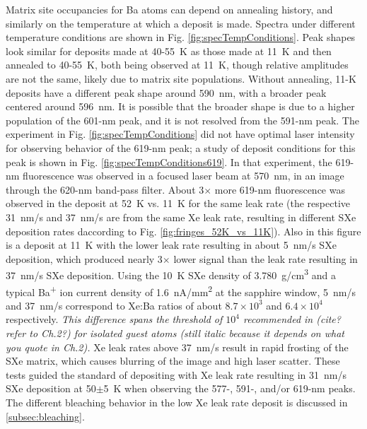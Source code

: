 Matrix site occupancies for Ba atoms can depend on annealing history, and similarly on the temperature at which a deposit is made.  Spectra under different temperature conditions are shown in Fig. \ref{fig:specTempConditions}.  Peak shapes look similar for deposits made at 40-55~K as those made at 11~K and then annealed to 40-55~K, both being observed at 11~K, though relative amplitudes are not the same, likely due to matrix site populations.  Without annealing, 11-K deposits have a different peak shape around 590~nm, with a broader peak centered around 596~nm.  It is possible that the broader shape is due to a higher population of the 601-nm peak, and it is not resolved from the 591-nm peak.  The experiment in Fig. \ref{fig:specTempConditions} did not have optimal laser intensity for observing behavior of the 619-nm peak; a study of deposit conditions for this peak is shown in Fig. \ref{fig:specTempConditions619}.  In that experiment, the 619-nm fluorescence was observed in a focused laser beam at 570~nm, in an image through the 620-nm band-pass filter.  About 3$\times$ more 619-nm fluorescence was observed in the deposit at 52~K vs. 11~K for the same leak rate (the respective 31~nm/s and 37~nm/s are from the same Xe leak rate, resulting in different SXe deposition rates daccording to Fig. \ref{fig:fringes_52K_vs_11K}).  Also in this figure is a deposit at 11~K with the lower leak rate resulting in about 5~nm/s SXe deposition, which produced nearly 3$\times$ lower signal than the leak rate resulting in 37~nm/s SXe deposition.  Using the 10~K SXe density of 3.780~g/cm\textsuperscript{3} \cite{SXeDensity} and a typical Ba\textsuperscript{+} ion current density of 1.6~nA/mm\textsuperscript{2} at the sapphire window, 5~nm/s and 37~nm/s correspond to Xe:Ba ratios of about $8.7 \times 10^{3}$ and $6.4 \times 10^{4}$ respectively.  \emph{\color{gray}This difference spans the threshold of $10^{4}$ recommended in (cite? refer to Ch.2?) for isolated guest atoms (still italic because it depends on what you quote in Ch.2).}   Xe leak rates above 37~nm/s result in rapid frosting of the SXe matrix, which causes blurring of the image and high laser scatter.  These tests guided the standard of depositing with Xe leak rate resulting in 31~nm/s SXe deposition at 50$\pm$5~K when observing the 577-, 591-, and/or 619-nm peaks.  The different bleaching behavior in the low Xe leak rate deposit is discussed in \ref{subsec:bleaching}.


